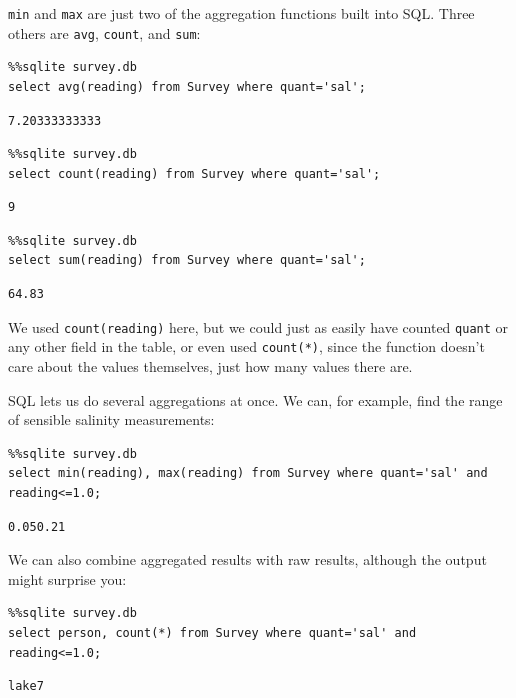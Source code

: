 \documentclass{book}
\begin{document}
\texttt{min} and \texttt{max} are just two of the aggregation functions
built into SQL. Three others are \texttt{avg}, \texttt{count}, and
\texttt{sum}:

\begin{verbatim}
%%sqlite survey.db
select avg(reading) from Survey where quant='sal';
\end{verbatim}

\begin{verbatim}
7.20333333333
\end{verbatim}

\begin{verbatim}
%%sqlite survey.db
select count(reading) from Survey where quant='sal';
\end{verbatim}

\begin{verbatim}
9
\end{verbatim}

\begin{verbatim}
%%sqlite survey.db
select sum(reading) from Survey where quant='sal';
\end{verbatim}

\begin{verbatim}
64.83
\end{verbatim}

We used \texttt{count(reading)} here, but we could just as easily have
counted \texttt{quant} or any other field in the table, or even used
\texttt{count(*)}, since the function doesn't care about the values
themselves, just how many values there are.

SQL lets us do several aggregations at once. We can, for example, find
the range of sensible salinity measurements:

\begin{verbatim}
%%sqlite survey.db
select min(reading), max(reading) from Survey where quant='sal' and reading<=1.0;
\end{verbatim}

\begin{verbatim}
0.050.21
\end{verbatim}

We can also combine aggregated results with raw results, although the
output might surprise you:

\begin{verbatim}
%%sqlite survey.db
select person, count(*) from Survey where quant='sal' and reading<=1.0;
\end{verbatim}

\begin{verbatim}
lake7
\end{verbatim}
\end{document}
